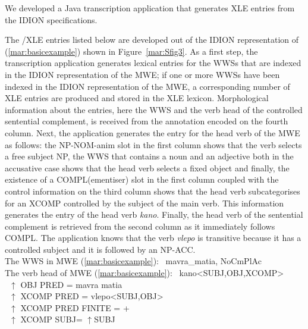 \documentclass[output=paper]{langsci/langscibook}
\begin{document}
We developed a Java transcription application that generates XLE entries from the IDION specifications. 

The /XLE entries listed below are developed out of the IDION representation of (\ref{mar:basicexample}) shown in Figure~\ref{mar:Sfig3}. As a first step, the transcription application generates lexical entries for the WWSs that are indexed in the IDION representation of the MWE;  if one or more WWSs have been indexed in the IDION representation of the MWE, a corresponding number of XLE entries are produced and stored in the XLE lexicon. Morphological information about the entries, here the WWS and the verb head of the controlled sentential complement, is received from the annotation encoded on the fourth column. Next, the application generates the entry for the head verb of the MWE as follows: the NP-NOM-anim slot in the first column shows that the verb selects a free subject NP, the WWS that contains a noun and an adjective both in the accusative case shows that the head verb selects a fixed object and finally,  the existence of a COMPL(ementiser) slot in the first column coupled with the control information on the third column shows that the head verb subcategorises for an XCOMP controlled by the subject of the main verb.  This information generates the entry of the head verb \textit{kano}.  Finally, the head verb of the sentential complement is retrieved from the second column as it immediately follows COMPL. The application knows that the verb \textit{vlepo} is transitive because it has a controlled subject and it is followed by an NP-ACC. \\


\noindent
The WWS in MWE (\ref{mar:basicexample}): %
~\hspace*{1em}mavra\_matia, NoCmPlAc \\

\noindent
The verb head of MWE (\ref{mar:basicexample}): %
~\hspace*{1em}kano<SUBJ,OBJ,XCOMP>\\
~\hspace*{15em}$\uparrow$ OBJ PRED = mavra matia\\
~\hspace*{15em}$\uparrow$ XCOMP PRED = vlepo<SUBJ,OBJ>\\
~\hspace*{15em}$\uparrow$ XCOMP PRED FINITE = +\\
~\hspace*{15em}$\uparrow$ XCOMP SUBJ= $\uparrow$SUBJ\\
\end{document}
